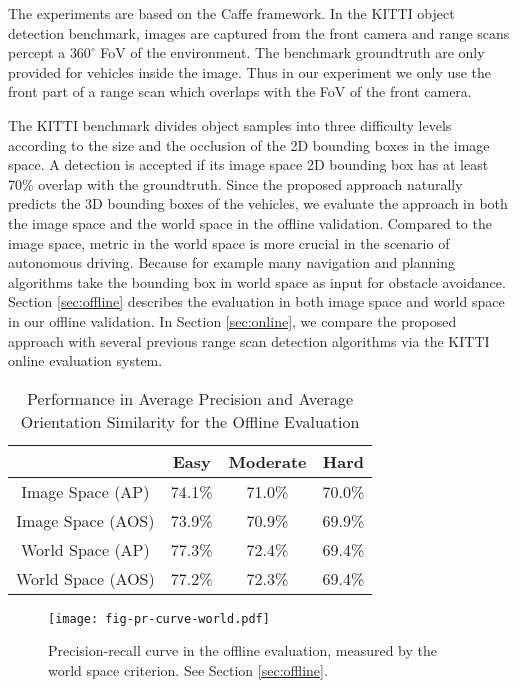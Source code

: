 \documentclass[conference]{IEEEtran}
\begin{document}
The experiments are based on the Caffe \cite{Jia2014} framework. In the KITTI object detection benchmark, images are captured from the front camera and range scans percept a $360^{\circ}$ FoV of the environment. The benchmark groundtruth are only provided for vehicles inside the image. Thus in our experiment we only use the front part of a range scan which overlaps with the FoV of the front camera.

The KITTI benchmark divides object samples into three difficulty levels according to the size and the occlusion of the 2D bounding boxes in the image space. A detection is accepted if its image space 2D bounding box has at least 70\% overlap with the groundtruth. Since the proposed approach naturally predicts the 3D bounding boxes of the vehicles, we evaluate the approach in both the image space and the world space in the offline validation. Compared to the image space, metric in the world space is more crucial in the scenario of autonomous driving. Because for example many navigation and planning algorithms take the bounding box in world space as input for obstacle avoidance. Section \ref{sec:offline} describes the evaluation in both image space and world space in our offline validation. In Section \ref{sec:online}, we compare the proposed approach with several previous range scan detection algorithms via the KITTI online evaluation system.

\begin{table}
    \centering
    \caption{Performance in Average Precision and Average Orientation Similarity for the Offline Evaluation}
    \begin{tabular}{cccc}
    \hline\hline
     & Easy & Moderate & Hard \\
    \hline
    Image Space (AP) & 74.1\% & 71.0\% & 70.0\% \\
    Image Space (AOS) & 73.9\% & 70.9\% & 69.9\%\\
    World Space (AP) & 77.3\% & 72.4\% & 69.4\% \\
    World Space (AOS) & 77.2\% & 72.3\% & 69.4\% \\
    \hline
    \end{tabular}
    \label{tab:offline}
\end{table}

\begin{figure}
    \centering
    \texttt{[image: fig-pr-curve-world.pdf]}
    \caption{Precision-recall curve in the offline evaluation, measured by the world space criterion. See Section \ref{sec:offline}. }
    \label{fig:curve}
\end{figure}
\end{document}
